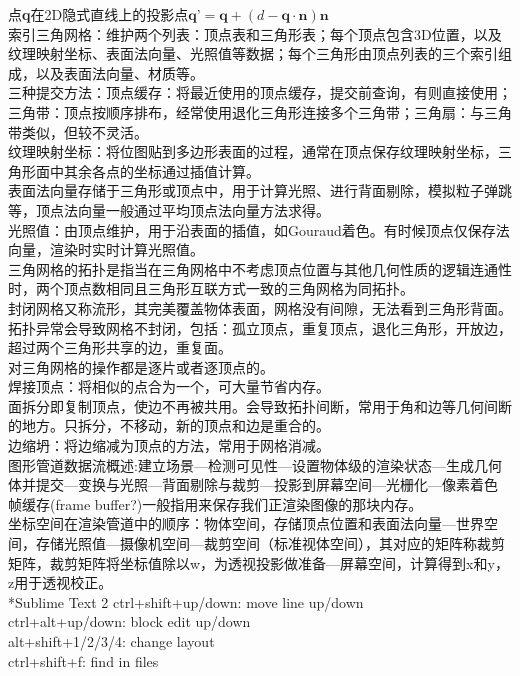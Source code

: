 \documentclass[UTF8]{ctexart}
\makeatletter
\renewcommand{\section}{\@startsection{section}{1}{0mm}
  {-\baselineskip}{0.5\baselineskip}{\bf\leftline}}
\makeatother
\begin{document}
点\textbf{q}在2D隐式直线上的投影点$\textbf{q'}=\textbf{q}+(d-\textbf{q}\cdot\textbf{n})\textbf{n}$\\
索引三角网格：维护两个列表：顶点表和三角形表；每个顶点包含3D位置，以及纹理映射坐标、表面法向量、光照值等数据；每个三角形由顶点列表的三个索引组成，以及表面法向量、材质等。\\
三种提交方法：顶点缓存：将最近使用的顶点缓存，提交前查询，有则直接使用；三角带：顶点按顺序排布，经常使用退化三角形连接多个三角带；三角扇：与三角带类似，但较不灵活。\\
纹理映射坐标：将位图贴到多边形表面的过程，通常在顶点保存纹理映射坐标，三角形面中其余各点的坐标通过插值计算。\\
表面法向量存储于三角形或顶点中，用于计算光照、进行背面剔除，模拟粒子弹跳等，顶点法向量一般通过平均顶点法向量方法求得。\\
光照值：由顶点维护，用于沿表面的插值，如Gouraud着色。有时候顶点仅保存法向量，渲染时实时计算光照值。\\
三角网格的拓扑是指当在三角网格中不考虑顶点位置与其他几何性质的逻辑连通性时，两个顶点数相同且三角形互联方式一致的三角网格为同拓扑。\\
封闭网格又称流形，其完美覆盖物体表面，网格没有间隙，无法看到三角形背面。\\
拓扑异常会导致网格不封闭，包括：孤立顶点，重复顶点，退化三角形，开放边，超过两个三角形共享的边，重复面。\\
对三角网格的操作都是逐片或者逐顶点的。\\
焊接顶点：将相似的点合为一个，可大量节省内存。\\
面拆分即复制顶点，使边不再被共用。会导致拓扑间断，常用于角和边等几何间断的地方。只拆分，不移动，新的顶点和边是重合的。\\
边缩坍：将边缩减为顶点的方法，常用于网格消减。\\
图形管道数据流概述:建立场景---检测可见性---设置物体级的渲染状态---生成几何体并提交---变换与光照---背面剔除与裁剪---投影到屏幕空间---光栅化---像素着色\\
帧缓存(frame buffer?)一般指用来保存我们正渲染图像的那块内存。\\
坐标空间在渲染管道中的顺序：物体空间，存储顶点位置和表面法向量---世界空间，存储光照值---摄像机空间---裁剪空间（标准视体空间），其对应的矩阵称裁剪矩阵，裁剪矩阵将坐标值除以w，为透视投影做准备---屏幕空间，计算得到x和y，z用于透视校正。\\
\section*{Sublime Text 2}
\noindent ctrl+shift+up/down: move line up/down\\
ctrl+alt+up/down: block edit up/down\\
alt+shift+1/2/3/4: change layout\\
ctrl+shift+f: find in files\\
\end{document}
